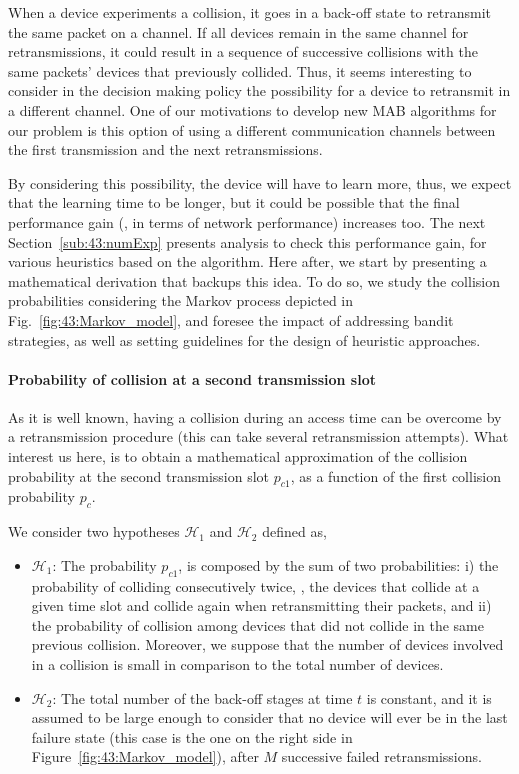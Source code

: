 When a device experiments a collision, it goes in a back-off state to retransmit the same packet on a channel.
If all devices remain in the same channel for retransmissions, it could result in a sequence of successive collisions with the same packets' devices that previously collided.
%
Thus, it seems interesting to consider in the decision making policy the possibility for a device to retransmit in a different channel.
One of our motivations to develop new MAB algorithms for our problem is this option of using a different communication channels between the first transmission and the next retransmissions.

By considering this possibility, the device will have to learn more, thus, we expect that the learning time to be longer, but it could be possible that the final performance gain (\ie, in terms of network performance) increases too.
The next Section~\ref{sub:43:numExp} presents analysis to check this performance gain, for various heuristics based on the \UCB{} algorithm.
%
Here after, we start by presenting a mathematical derivation that backups this idea.
To do so, we study the collision probabilities considering the Markov process depicted in Fig.~\ref{fig:43:Markov_model}, and foresee the impact of addressing bandit strategies, as well as setting guidelines for the design of heuristic approaches.


\paragraph{Probability of collision at a second transmission slot}

As it is well known, having a collision during an access time can be overcome by a retransmission procedure (this can take several retransmission attempts).
What interest us here, is to obtain a mathematical approximation of the collision probability at the second transmission slot $p_{c1}$, as a function of the first collision probability $p_{c}$.

We consider two hypotheses $\mathcal{H}_{1}$ and $\mathcal{H}_{2}$ defined as,
\begin{itemize}
	\item $\mathcal{H}_{1}$:
    The probability $p_{c1}$, is composed by the sum of two probabilities: i)
    the probability of colliding consecutively twice, \ie, the devices that collide at a given time slot and collide again when retransmitting their packets,
    and ii) the probability of collision among devices that did not collide in the same previous collision. Moreover, we suppose that the number of devices involved in a collision is small in comparison to the total number of devices.
	\item $\mathcal{H}_{2}$:
	The total number of the back-off stages at time $t$ is constant, and it is assumed to be large enough to consider that no device will ever be in the last failure state (this case is the one on the right side in Figure~\ref{fig:43:Markov_model}), after $M$ successive failed retransmissions.
\end{itemize}

